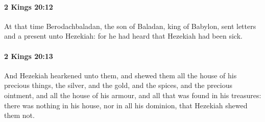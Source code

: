 		\paragraph{2 Kings 20:12} %
			\label{2KINGS-20-12}

			At that time Berodachbaladan, the son of Baladan, king of Babylon, sent letters and a present unto Hezekiah: for he had heard that Hezekiah had been sick.


		\paragraph{2 Kings 20:13} %
			\label{2KINGS-20-13}

			And Hezekiah hearkened unto them, and shewed them all the house of his precious things, the silver, and the gold, and the spices, and the precious ointment, and all the house of his armour, and all that was found in his treasures: there was nothing in his house, nor in all his dominion, that Hezekiah shewed them not.

